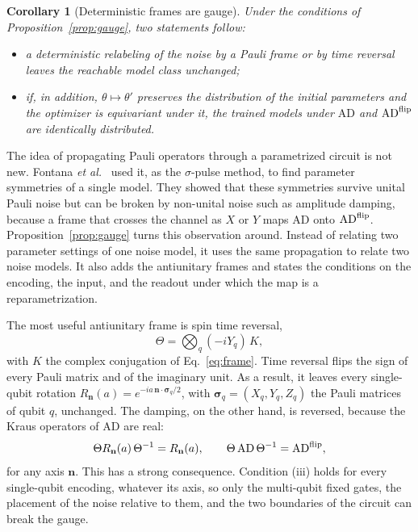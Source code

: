 \documentclass[
 aps,pra,
 twocolumn,
 superscriptaddress,
 longbibliography,
 nofootinbib
]{revtex4-2}
\newcommand{\AD}{\mathrm{AD}}
\newtheorem{corollary}{Corollary}
\begin{document}
\begin{corollary}[Deterministic frames are gauge]\label{cor:det}
Under the conditions of Proposition~\ref{prop:gauge}, two statements follow:
\begin{itemize}
\item[(a)] a deterministic relabeling of the noise by a Pauli frame or by time
reversal leaves the reachable model class unchanged;
\item[(b)] if, in addition, $\theta\mapsto\theta'$ preserves the distribution of
the initial parameters and the optimizer is equivariant under it, the trained
models under $\AD$ and $\AD^{\rm flip}$ are identically distributed.
\end{itemize}
\end{corollary}

The idea of propagating Pauli operators through a parametrized circuit is not
new. Fontana \textit{et al.}~\cite{fontana2022nontrivial} used it, as the
$\sigma$-pulse method, to find parameter symmetries of a single model. They
showed that these symmetries survive unital Pauli noise but can be broken by
non-unital noise such as amplitude damping, because a frame that crosses the
channel as $X$ or $Y$ maps $\AD$ onto $\AD^{\rm flip}$.
Proposition~\ref{prop:gauge} turns this observation around. Instead of relating
two parameter settings of one noise model, it uses the same propagation to
relate two noise models. It also adds the antiunitary frames and states the
conditions on the encoding, the input, and the readout under which the map is
a reparametrization.

The most useful antiunitary frame is spin time reversal,
\begin{equation}
\Theta=\bigotimes_q(-iY_q)\,K ,
\label{eq:theta}
\end{equation}
with $K$ the complex conjugation of Eq.~\eqref{eq:frame}. Time reversal flips
the sign of every Pauli matrix and of the imaginary unit. As a result, it
leaves every single-qubit rotation
$R_{\mathbf n}(a)=e^{-ia\,\mathbf n\cdot\boldsymbol\sigma_q/2}$, with
$\boldsymbol\sigma_q=(X_q,Y_q,Z_q)$ the Pauli matrices of qubit $q$, unchanged.
The damping, on the other hand, is reversed, because the Kraus operators of
$\AD$ are real:
\begin{equation}
\Theta R_{\mathbf n}(a)\,\Theta^{-1}=R_{\mathbf n}(a),\qquad
\Theta\,\AD\,\Theta^{-1}=\AD^{\rm flip},
\label{eq:theta_inv}
\end{equation}
for any axis $\mathbf n$. This has a strong consequence. Condition (iii) holds
for every single-qubit encoding, whatever its axis, so only the multi-qubit
fixed gates, the placement of the noise relative to them, and the two
boundaries of the circuit can break the gauge.
\end{document}
